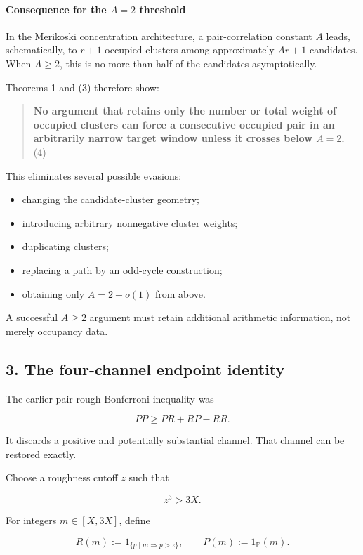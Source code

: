 \paragraph{Consequence for the \(A=2\) threshold}

In the Merikoski concentration architecture, a pair-correlation constant \(A\) leads, schematically, to \(r+1\) occupied clusters among approximately \(Ar+1\) candidates. When \(A\ge2\), this is no more than half of the candidates asymptotically.

Theorems 1 and (3) therefore show:

\begin{quote}
\textbf{No argument that retains only the number or total weight of occupied clusters can force a consecutive occupied pair in an arbitrarily narrow target window unless it crosses below \(A=2\).} (4)
\end{quote}

This eliminates several possible evasions:

\begin{itemize}
\item changing the candidate-cluster geometry;
\item introducing arbitrary nonnegative cluster weights;
\item duplicating clusters;
\item replacing a path by an odd-cycle construction;
\item obtaining only \(A=2+o(1)\) from above.
\end{itemize}

A successful \(A\ge2\) argument must retain additional arithmetic information, not merely occupancy data.

\subsection*{3. The four-channel endpoint identity}

The earlier pair-rough Bonferroni inequality was

\[
PP\ge PR+RP-RR.
\]

It discards a positive and potentially substantial channel. That channel can be restored exactly.

Choose a roughness cutoff \(z\) such that

\[
z^3>3X.
\]

For integers \(m\in[X,3X]\), define

\[
R(m)
:=
1_{\{p\mid m\Rightarrow p>z\}},
\qquad
P(m):=1_{\mathbb P}(m).
\]

